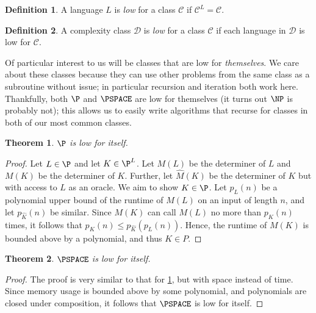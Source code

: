 \documentclass[english]{reedthesis}
\theoremstyle{plain}
\newtheorem{thm}{Theorem}[section]
\theoremstyle{definition}
\newtheorem{defn}[defn]{Definition}
\theoremstyle{remark}
\begin{document}
\begin{defn}\label{def:low-class}
  A language $L$ is \emph{low} for a class $\mathcal{C}$ if $\mathcal{C}^{L} = \mathcal{C}$.
\end{defn}

\begin{defn}\label{def:low-lang}
  A complexity class $\mathcal{D}$ is \emph{low} for a class $\mathcal{C}$ if each language in $\mathcal{D}$
  is low for $\mathcal{C}$.
\end{defn}

Of particular interest to us will be classes that are low for \emph{themselves}.
We care about these classes because they can use other problems from the same
class as a subroutine without issue; in particular recursion and iteration both
work here. Thankfully, both $\P$ and $\PSPACE$ are low for themselves (it turns
out $\NP$ is probably not); this allows us to easily write algorithms that
recurse for classes in both of our most common classes.

\begin{thm}\label{thm:p-low}
  $\P$ is low for itself.
\end{thm}

\begin{proof}
  Let $L \in \P$ and let $K \in \P^{L}$. Let $M(L)$ be the determiner of $L$ and
  $M(K)$ be the determiner of $K$. Further, let $\hat{M}(K)$ be the determiner
  of $K$ but with access to $L$ as an oracle. We aim to show $K \in \P$. Let
  $p_{L}(n)$ be a polynomial upper bound of the runtime of $M(L)$ on an input of
  length $n$, and let $p_{\hat{K}}(n)$ be similar. Since $M(K)$ can call $M(L)$ no
  more than $p_{\hat{K}}(n)$ times, it follows that
  $p_{K}(n) \le p_{\hat{K}}(p_{L}(n))$. Hence, the runtime of $M(K)$ is bounded
  above by a polynomial, and thus $K \in P$.
\end{proof}

\begin{thm}\label{thm:pspace-low}
  $\PSPACE$ is low for itself.
\end{thm}

\begin{proof}
  The proof is very similar to that for \cref{thm:p-low}, but with space instead
  of time. Since memory usage is bounded above by some polynomial, and
  polynomials are closed under composition, it follows that $\PSPACE$ is low for
  itself.
\end{proof}
\end{document}
